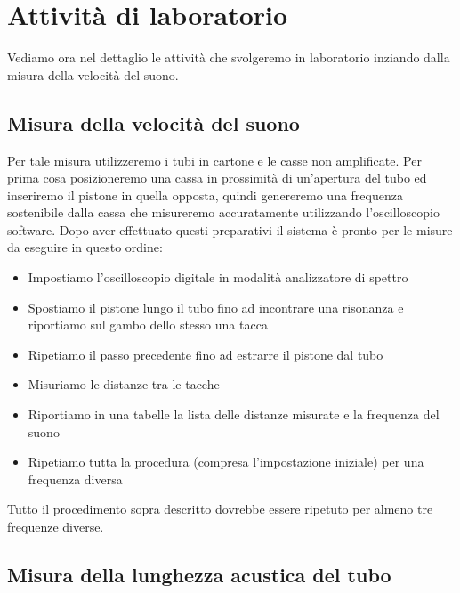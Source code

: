\documentclass[a4paper,10pt,oneside]{article}
\begin{document}
\section{Attività di laboratorio}
Vediamo ora nel dettaglio le attività che svolgeremo in laboratorio inziando dalla misura della velocità del suono.

\subsection{Misura della velocità del suono}
Per tale misura utilizzeremo i tubi in cartone e le casse non amplificate. Per prima cosa posizioneremo una cassa in prossimità di un'apertura del tubo ed inseriremo il pistone in quella opposta, quindi genereremo una frequenza sostenibile dalla cassa che misureremo accuratamente utilizzando l'oscilloscopio software. Dopo aver effettuato questi preparativi il sistema è pronto per le misure da eseguire in questo ordine:
\begin{itemize}
 \item Impostiamo l'oscilloscopio digitale in modalità analizzatore di spettro
 \item Spostiamo il pistone lungo il tubo fino ad incontrare una risonanza e riportiamo sul gambo dello stesso una tacca
 \item Ripetiamo il passo precedente fino ad estrarre il pistone dal tubo
 \item Misuriamo le distanze tra le tacche 
 \item Riportiamo in una tabelle la lista delle distanze misurate e la frequenza del suono
\item Ripetiamo tutta la procedura (compresa l'impostazione iniziale) per una frequenza diversa
\end{itemize}
Tutto il procedimento sopra descritto dovrebbe essere ripetuto per almeno tre frequenze diverse.

\subsection{Misura della lunghezza acustica del tubo}
\end{document}
